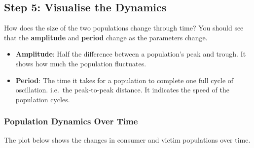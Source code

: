 \documentclass[
  a4paper]{book}
\providecommand{\tightlist}{%
  \setlength{\itemsep}{0pt}\setlength{\parskip}{0pt}}
\begin{document}
\subsection{Step 5: Visualise the Dynamics}\label{step-5-visualise-the-dynamics}

How does the size of the two populations change through time? You should see that the \textbf{amplitude} and \textbf{period} change as the parameters change.

\begin{itemize}
\tightlist
\item
  \textbf{Amplitude}: Half the difference between a population's peak and trough. It shows how much the population fluctuates.
\item
  \textbf{Period}: The time it takes for a population to complete one full cycle of oscillation. i.e.~the peak-to-peak distance. It indicates the speed of the population cycles.
\end{itemize}

\subsubsection{Population Dynamics Over Time}\label{population-dynamics-over-time}

The plot below shows the changes in consumer and victim populations over time.
\end{document}
